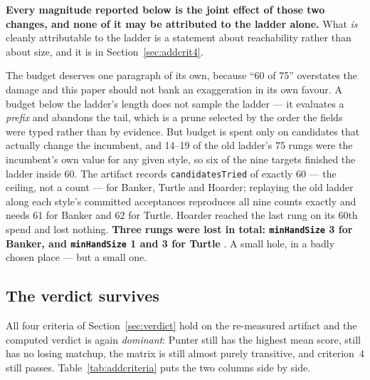\documentclass[11pt]{article}
\newcommand{\code}[1]{\texttt{#1}}
\begin{document}
\textbf{Every magnitude reported below is the joint effect of those two changes, and none of it
may be attributed to the ladder alone.} What \emph{is} cleanly attributable to the ladder is a
statement about reachability rather than about size, and it is in
Section~\ref{sec:addcrit4}.

The budget deserves one paragraph of its own, because ``60 of 75'' overstates the damage and
this paper should not bank an exaggeration in its own favour. A budget below the ladder's
length does not sample the ladder --- it evaluates a \emph{prefix} and abandons the tail, which
is a prune selected by the order the fields were typed rather than by evidence. But budget is
spent only on candidates that actually change the incumbent, and 14--19 of the old ladder's 75
rungs were the incumbent's own value for any given style, so six of the nine targets finished
the ladder inside 60. The artifact records \code{candidatesTried} of exactly 60 --- the ceiling,
not a count --- for Banker, Turtle and Hoarder; replaying the old ladder along each style's
committed acceptances reproduces all nine counts exactly and needs 61 for Banker and 62 for
Turtle. Hoarder reached the last rung on its 60th spend and lost nothing. \textbf{Three rungs
were lost in total: \code{minHandSize} 3 for Banker, and \code{minHandSize} 1 and 3 for
Turtle} \cite{exploitladder}. A small hole, in a badly chosen place --- but a small one.

\subsection{The verdict survives}

All four criteria of Section~\ref{sec:verdict} hold on the re-measured artifact and the
computed verdict is again \emph{dominant}: Punter still has the highest mean score, still has
no losing matchup, the matrix is still almost purely transitive, and criterion~4 still passes.
Table~\ref{tab:addcriteria} puts the two columns side by side.
\end{document}
